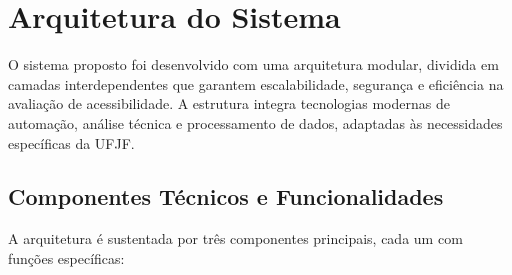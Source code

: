\documentclass[12pt]{article}
\begin{document}
\section{Arquitetura do Sistema}\label{sec:arquitetura}
O sistema proposto foi desenvolvido com uma arquitetura modular, dividida em
camadas interdependentes que garantem escalabilidade, segurança e eficiência na
avaliação de acessibilidade. A estrutura integra tecnologias modernas de automação,
análise técnica e processamento de dados, adaptadas às necessidades específicas da
UFJF.\@

\subsection{Componentes Técnicos e Funcionalidades}\label{subsec:componentes}
A arquitetura é sustentada por três componentes principais, cada um com funções
específicas:
\end{document}

